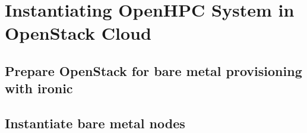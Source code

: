 \documentclass[letterpaper]{article}
\begin{document}
\vspace*{-0.15cm}
\vspace*{-0.50cm}

\clearpage
\section{Instantiating OpenHPC System in OpenStack Cloud}

	
\clearpage
\subsection{Prepare OpenStack for bare metal provisioning with ironic} \label{sec:o-s_prep-ironic}


\vspace*{-0.15cm}
\subsection{Instantiate bare metal nodes} \label{sec:instantiate-bare-metal}

\end{document}
